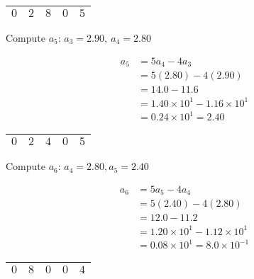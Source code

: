 \documentclass{article}
\begin{document}
\begin{enumerate}
\begin{enumerate}
        \begin{center}
        \renewcommand{\arraystretch}{1.7}
        \begin{tabular}{|c|c|c|c|c|}
        \hline
        $0$ & $2$ & $8$ & $0$ & $5$ \\
        \hline
        \end{tabular}
        \end{center}


        Compute $a_{5}$: $a_{3} = 2.90, \ a_{4} = 2.80$

        \begin{align*}
        a_{5} &= 5a_{4} - 4a_{3} \\
            &= 5(2.80) - 4(2.90) \\
            &= 14.0 - 11.6 \\
            &= 1.40 \times 10^{1} - 1.16 \times 10^{1} \\ 
            &= 0.24 \times 10^{1} = 2.40
        \end{align*}

        \begin{center}
        \renewcommand{\arraystretch}{1.7}
        \begin{tabular}{|c|c|c|c|c|}
        \hline
        $0$ & $2$ & $4$ & $0$ & $5$ \\
        \hline
        \end{tabular}
        \end{center}


        Compute $a_{6}$: $a_{4} = 2.80, a_{5} = 2.40$

        \begin{align*}
         a_{6} &= 5a_{5} - 4a_{4} \\
            &= 5(2.40) - 4(2.80) \\
            &= 12.0 - 11.2 \\
            &= 1.20 \times 10^{1} - 1.12 \times 10^{1} \\
            &= 0.08 \times 10^{1} = 8.0 \times 10^{-1}
        \end{align*}

        \begin{center}
        \renewcommand{\arraystretch}{1.7}
        \begin{tabular}{|c|c|c|c|c|}
        \hline
        $0$ & $8$ & $0$ & $0$ & $4$ \\
        \hline
        \end{tabular}
        \end{center}



\end{enumerate}
\end{enumerate}
\end{document}
